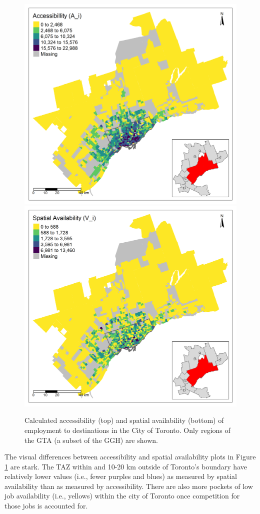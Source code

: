 \documentclass[]{elsarticle} %
\begin{document}
\begin{figure}

{\centering \includegraphics[width=0.8\linewidth]{images/allplot_access_TTS} \includegraphics[width=0.8\linewidth]{images/allplot_SA_TTS} 

}

\caption{\label{fig:plot-access-SA-Toronto-TTS}Calculated accessibility (top) and spatial availability (bottom) of employment to destinations in the City of Toronto. Only regions of the GTA (a subset of the GGH) are shown.}\label{fig:plot-access-SA-Toronto-TTS}
\end{figure}

The visual differences between accessibility and spatial availability
plots in Figure \ref{fig:plot-access-SA-Toronto-TTS} are stark. The TAZ
within and 10-20 km outside of Toronto's boundary have relatively lower
values (i.e., fewer purples and blues) as measured by spatial
availability than as measured by accessibility. There are also more
pockets of low job availability (i.e., yellows) within the city of
Toronto once competition for those jobs is accounted for.
\end{document}
